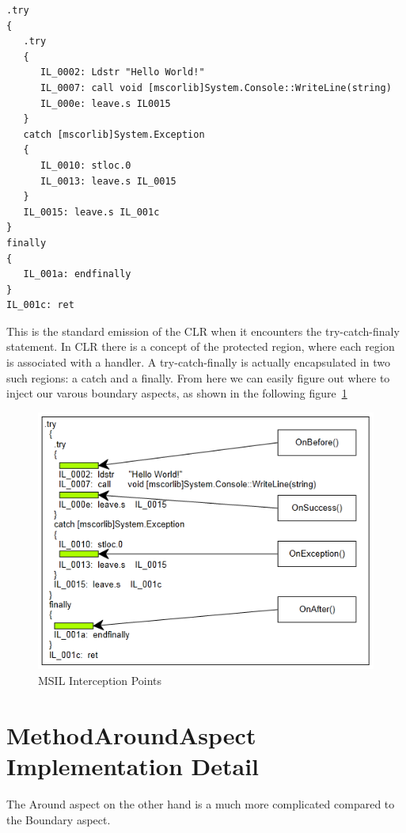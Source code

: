 \begin{lstlisting}[caption={MSIL generated for sample C\# function}, label=methodboundaryB4]
.try
{
   .try
   {
      IL_0002: Ldstr "Hello World!"
      IL_0007: call void [mscorlib]System.Console::WriteLine(string)
      IL_000e: leave.s IL0015
   }
   catch [mscorlib]System.Exception
   {
      IL_0010: stloc.0
      IL_0013: leave.s IL_0015
   }
   IL_0015: leave.s IL_001c
}
finally
{
   IL_001a: endfinally
}
IL_001c: ret
\end{lstlisting}

This is the standard emission of the CLR when it encounters the try-catch-finaly statement. In CLR there is a concept of the protected region, where each region is associated with a handler. A try-catch-finally is actually encapsulated in two such regions: a catch and a finally. From here we can easily figure out where to inject our varous boundary aspects, as shown in the following figure~\ref{methodboundary02}

\begin{figure}[H]
  \includegraphics[scale=1.0]{MethodBoundaryOverview.PNG}
  \centering
  \caption{MSIL Interception Points\label{methodboundary02}}
\end{figure}

\section{MethodAroundAspect Implementation Detail}

The Around aspect on the other hand is a much more complicated compared to the Boundary aspect.

